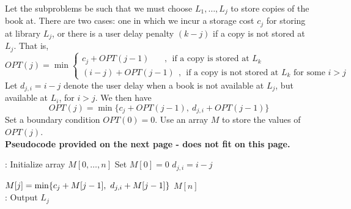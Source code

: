 \documentclass[twoside,11pt]{homework}
\newcommand\NoProc{\renewcommand\algorithmicprocedure{}}
\begin{document}
\noindent
Let the subproblems be such that we must choose $L_1, \dots, L_j$ to store copies of the book at. There are two cases: one in which we incur a storage cost $c_j$ for storing at library $L_j$, or there is a user delay penalty $(k-j)$ if a copy is not stored at $L_j$.  That is, 
$$OPT(j) = \min 
\begin{cases} 
c_j + OPT(j-1) \ \ \ \ \ \ \ \ , \ \ \textrm{if a copy is stored at } L_k \\
 (i-j) + OPT(j-1) \ \ , \ \ \textrm{if a copy is not stored at } L_k \textrm{ for some } i > j
\end{cases}
$$
Let $d_{j, i} = i - j$ denote the user delay when a book is not available at $L_j$, but available at $L_i$, for $i>j$.  We then have
$$OPT(j) = \min \{c_j + OPT(j-1), \ d_{j, i} + OPT(j-1) \}  $$
Set a boundary condition $OPT(0) = 0$.   Use an array $M$ to store the values of $OPT(j)$.   \\

\noindent
\textbf{Pseudocode provided on the next page - does not fit on this page.}\\ 

\begin{algorithm}
\begin{algorithmic}[1]
\NoProc
{}:  
\State Initialize array $M[0,  \dots, n]$
\State Set $M[0] = 0$
\State $d_{j, i} = i - j$   
\EndFor
\EndFor

\State $M[j] = \mathlarger{\min \{c_j + M[j-1], \ d_{j, i} + M[j-1] \} }$
\EndFor
\State \Return $M[n]$
\EndProcedure \\

:  
 \Return
\Else
{}
\State Output $L_j$
\State {}
\State {}
\EndIf
\EndIf
\EndProcedure
\end{algorithmic}
\end{algorithm}

\end{document}
